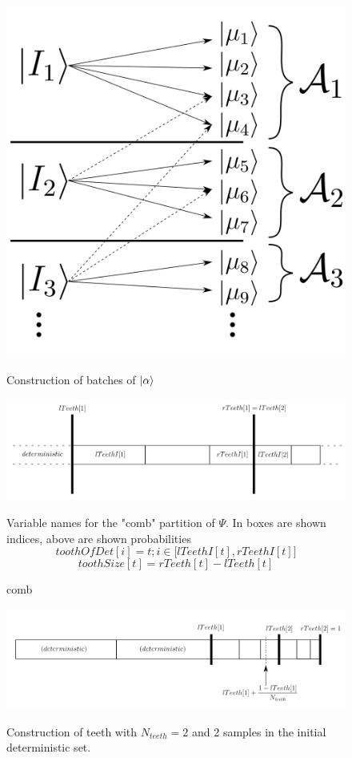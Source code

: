 \documentclass[./thesis.tex]{subfiles}
\begin{document}
\begin{figure}[h!]
	\begin{center}
		\includegraphics[width=0.5\columnwidth]{figures/pt2/mu_sample}
		\caption{}
		\label{fig:mu_sample}
		Construction of batches of $\ket \alpha$
	\end{center}
\end{figure}



\begin{figure}[h!]
	\label{comb_variables}
	\begin{center}
		\includegraphics[width=1.00\columnwidth]{figures/pt2/teeth}
		\caption{comb}
		Variable names for the "comb" partition of $\Psi$. In boxes are shown indices, above are shown probabilities
		$$toothOfDet[i] = t ; i \in \big [ lTeethI[t],rTeethI[t] \big ]$$
		$$toothSize[t] = rTeeth[t] - lTeeth[t]$$
	\end{center}
\end{figure}

\begin{figure}[h!]
	\begin{center}
		\includegraphics[width=1.00\columnwidth]{figures/pt2/teeths}
		\caption{\label{filtering}}
		Construction of teeth with $N_{teeth} = 2$ and 2 samples in the initial deterministic set.
	\end{center}
\end{figure}
\end{document}
